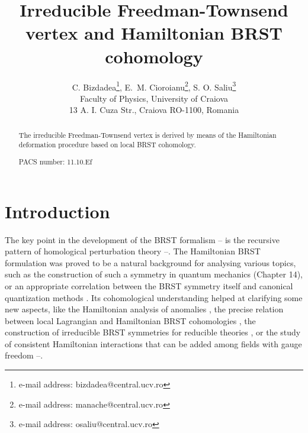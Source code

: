 \documentclass[a4paper,12pt]{article}
\begin{document}
\author{C. Bizdadea\thanks{%
e-mail address: bizdadea@central.ucv.ro}, E.\ M. Cioroianu\thanks{%
e-mail address: manache@central.ucv.ro}, S. O. Saliu\thanks{%
e-mail address: osaliu@central.ucv.ro} \\
Faculty of Physics, University of Craiova\\
13 A. I. Cuza Str., Craiova RO-1100, Romania}
\title{Irreducible Freedman-Townsend vertex and Hamiltonian BRST cohomology}
\maketitle

\begin{abstract}
The irreducible Freedman-Townsend vertex is derived by means of the
Hamiltonian deformation procedure based on local BRST cohomology.

PACS number: 11.10.Ef
\end{abstract}

\section{Introduction}

The key point in the development of the BRST formalism \cite{1}--\cite{13}
is the recursive pattern of homological perturbation theory \cite{14}--\cite
{20}. The Hamiltonian BRST formulation was proved to be a natural background
for analysing various topics, such as the construction of such a symmetry in
quantum mechanics \cite{8} (Chapter 14), or an appropriate correlation
between the BRST symmetry itself and canonical quantization methods \cite{21}%
. Its cohomological understanding helped at clarifying some new aspects,
like the Hamiltonian analysis of anomalies \cite{22}, the precise relation
between local Lagrangian and Hamiltonian BRST cohomologies \cite{23}, the
construction of irreducible BRST symmetries for reducible theories \cite{24}%
, or the study of consistent Hamiltonian interactions that can be added
among fields with gauge freedom \cite{25}--\cite{28}.
\end{document}
